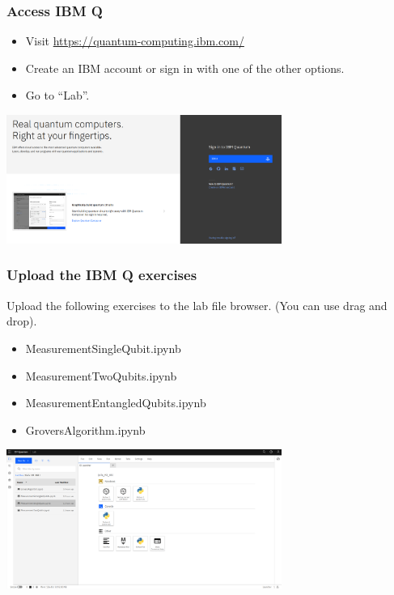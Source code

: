 \documentclass[10pt]{beamer}
\begin{document}
\begin{frame}
  \frametitle{Access IBM Q}
  \begin{itemize}
  \item Visit \href{https://quantum-computing.ibm.com/}{https://quantum-computing.ibm.com/}
  \item Create an IBM account or sign in with one of the other options.
  \item Go to ``Lab''.
  \end{itemize}
  \centering
  \includegraphics[width=9cm]{img/ibmq-login.png}
\end{frame}

\begin{frame}
  \frametitle{Upload the IBM Q exercises}
  Upload the following exercises to the lab file browser. (You can use drag and drop).
  \begin{itemize}
  \item MeasurementSingleQubit.ipynb
  \item MeasurementTwoQubits.ipynb
  \item MeasurementEntangledQubits.ipynb
  \item GroversAlgorithm.ipynb
  \end{itemize}

  \centering
  \includegraphics[width=9cm]{img/ibmq-upload.png}
\end{frame}
\end{document}
